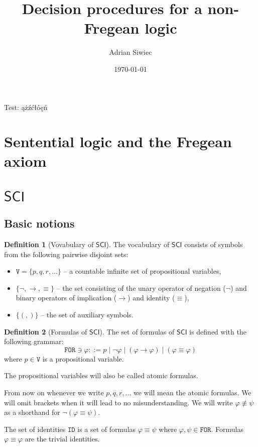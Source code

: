 \documentclass{article}
\title{Decision procedures for a non-Fregean logic \SCI}
\author{Adrian Siwiec}
\theoremstyle{definition}
\newtheorem{definition}{Definition}[section]
\newcommand*{\id}{\equiv}
\newcommand*{\ra}{\rightarrow}
\newcommand*{\V}{\texttt{V}}
\newcommand*{\FOR}{\texttt{FOR}}
\newcommand*{\ID}{\texttt{ID}}
\newcommand{\SCI}{$\mathsf{SCI}$\xspace}
\begin{document}
\date{\today}

\maketitle

Test: ążźćłóęń

\section{Sentential logic and the Fregean axiom}
\section{\SCI}
\subsection{Basic notions}

\begin{definition}[Vovabulary of \SCI]
    The vocabulary of \SCI consists of symbols from the following pairwise disjoint sets:
    \begin{itemize}
        \item $\V = \{p, q, r, ...\}$ -- a countable infinite set of propositional variables,
        \item $\{\lnot, \ra, \id \}$  -- the set consisting of the unary operator of negation ($\lnot$) and binary operators of implication ($\ra$) and identity ($\id$),
        \item $\{(,)\}$ -- the set of auxiliary symbols.
    \end{itemize}
\end{definition}
\begin{definition}[Formulas of \SCI]
    The set of formulas of \SCI is defined with the following grammar:
    $$
        \FOR \ni \varphi ::= p  \; | \;  \lnot \varphi \; | \; (\varphi \ra \varphi) \; | \; (\varphi \id \varphi)
    $$ where $p \in \V$ is a propositional variable.
\end{definition}
The propositional variables will also be called atomic formulas.

From now on whenever we write $p, q, r, ... $ we will mean the atomic formulas.
We will omit brackets when it will lead to no misunderstanding. We will write
$\varphi \not \id \psi$ as a shorthand for $\lnot(\varphi \id \psi)$.

The set of identities $\ID$ is a set of formulas $\varphi \id \psi$ where
$\varphi, \psi \in \FOR$. Formulas $\varphi \id \varphi$ are the trivial
identities.
\end{document}
